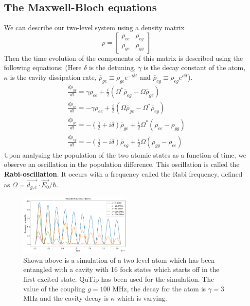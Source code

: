 \documentclass[%
 reprint,
 amsmath,amssymb,
 aps,
]{revtex4-2}
\begin{document}
\subsection{The Maxwell-Bloch equations}
We can describe our two-level system using a density matrix 
\begin{equation*}
\rho =
\begin{bmatrix}
\rho_{ee} & \rho_{eg}\\ 
\rho_{ge} & \rho_{gg}
\end{bmatrix}
\end{equation*}
Then the time evolution of the components of this matrix is described using the following equations: (Here $\delta$ is the detuning, $\gamma$ is the decay constant of the atom, $\kappa$ is the cavity dissipation rate, ${\displaystyle {\bar {\rho }}_{ge}\equiv \rho _{ge}e^{-i\delta t}}$ and ${\displaystyle {\bar {\rho }}_{eg}\equiv \rho _{eg}e^{i\delta t}}$).
\begin{gather}
    {\frac  {d\rho _{{gg}}}{dt}}=\gamma \rho _{{ee}}+{\frac  {i}{2}}(\Omega ^{*}{\bar  \rho }_{{eg}}-\Omega {\bar  \rho }_{{ge}})\\
    {\frac  {d\rho _{{ee}}}{dt}}=-\gamma \rho _{{ee}}+{\frac  {i}{2}}(\Omega {\bar  \rho }_{{ge}}-\Omega ^{*}{\bar  \rho }_{{eg}})\\
    {\frac  {d{\bar  \rho }_{{ge}}}{dt}}=-\left({\frac  {\gamma }{2}}+i\delta \right){\bar  \rho }_{{ge}}+{\frac  {i}{2}}\Omega ^{*}(\rho _{{ee}}-\rho _{{gg}})\\
    \frac{d \bar \rho_{eg}}{dt} = - \left( \frac{\gamma}{2} - i\delta \right) \bar \rho_{eg} + \frac{i}{2}\Omega(\rho_{gg} - \rho_{ee})
\end{gather}
Upon analysing the population of the two atomic states as a function of time, we observe an oscillation in the population difference. This oscillation is called the \textbf{Rabi-oscillation}. It occurs with a frequency called the Rabi frequency, defined as ${\displaystyle \Omega ={\vec {d_{g,e}}}\cdot {\vec {E_{0}}}/\hbar }$.
\begin{figure}[ht]
    \centering
    \includegraphics[width=0.5\textwidth]{images/vacuum rabi.png}
    \caption{Shown above is a simulation of a two level atom which has been entangled with a cavity with 16 fock states which starts off in the first excited state. QuTip \cite{Johansson_2012,Johansson_2013} has been used for the simulation. The value of the coupling $g = 100$ MHz, the decay for the atom is $\gamma = 3$ MHz and the cavity decay is $\kappa$ which is varying.}
\end{figure}
\end{document}
